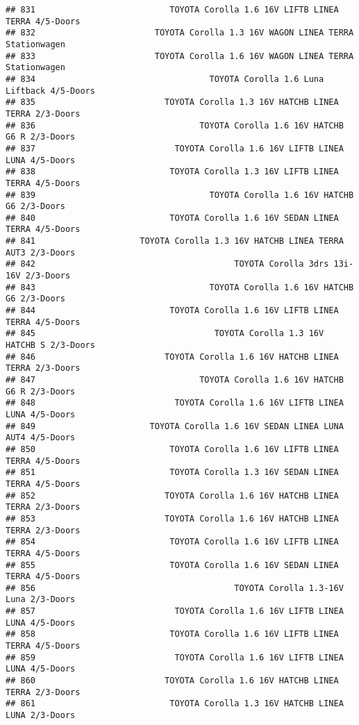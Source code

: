 \documentclass[]{article}
\begin{document}
\begin{verbatim}
## 831                           TOYOTA Corolla 1.6 16V LIFTB LINEA TERRA 4/5-Doors
## 832                        TOYOTA Corolla 1.3 16V WAGON LINEA TERRA Stationwagen
## 833                        TOYOTA Corolla 1.6 16V WAGON LINEA TERRA Stationwagen
## 834                                   TOYOTA Corolla 1.6 Luna Liftback 4/5-Doors
## 835                          TOYOTA Corolla 1.3 16V HATCHB LINEA TERRA 2/3-Doors
## 836                                 TOYOTA Corolla 1.6 16V HATCHB G6 R 2/3-Doors
## 837                            TOYOTA Corolla 1.6 16V LIFTB LINEA LUNA 4/5-Doors
## 838                           TOYOTA Corolla 1.3 16V LIFTB LINEA TERRA 4/5-Doors
## 839                                   TOYOTA Corolla 1.6 16V HATCHB G6 2/3-Doors
## 840                           TOYOTA Corolla 1.6 16V SEDAN LINEA TERRA 4/5-Doors
## 841                     TOYOTA Corolla 1.3 16V HATCHB LINEA TERRA AUT3 2/3-Doors
## 842                                        TOYOTA Corolla 3drs 13i-16V 2/3-Doors
## 843                                   TOYOTA Corolla 1.6 16V HATCHB G6 2/3-Doors
## 844                           TOYOTA Corolla 1.6 16V LIFTB LINEA TERRA 4/5-Doors
## 845                                    TOYOTA Corolla 1.3 16V HATCHB S 2/3-Doors
## 846                          TOYOTA Corolla 1.6 16V HATCHB LINEA TERRA 2/3-Doors
## 847                                 TOYOTA Corolla 1.6 16V HATCHB G6 R 2/3-Doors
## 848                            TOYOTA Corolla 1.6 16V LIFTB LINEA LUNA 4/5-Doors
## 849                       TOYOTA Corolla 1.6 16V SEDAN LINEA LUNA AUT4 4/5-Doors
## 850                           TOYOTA Corolla 1.6 16V LIFTB LINEA TERRA 4/5-Doors
## 851                           TOYOTA Corolla 1.3 16V SEDAN LINEA TERRA 4/5-Doors
## 852                          TOYOTA Corolla 1.6 16V HATCHB LINEA TERRA 2/3-Doors
## 853                          TOYOTA Corolla 1.6 16V HATCHB LINEA TERRA 2/3-Doors
## 854                           TOYOTA Corolla 1.6 16V LIFTB LINEA TERRA 4/5-Doors
## 855                           TOYOTA Corolla 1.6 16V SEDAN LINEA TERRA 4/5-Doors
## 856                                        TOYOTA Corolla 1.3-16V Luna 2/3-Doors
## 857                            TOYOTA Corolla 1.6 16V LIFTB LINEA LUNA 4/5-Doors
## 858                           TOYOTA Corolla 1.6 16V LIFTB LINEA TERRA 4/5-Doors
## 859                            TOYOTA Corolla 1.6 16V LIFTB LINEA LUNA 4/5-Doors
## 860                          TOYOTA Corolla 1.6 16V HATCHB LINEA TERRA 2/3-Doors
## 861                           TOYOTA Corolla 1.3 16V HATCHB LINEA LUNA 2/3-Doors

\end{verbatim}
\end{document}
